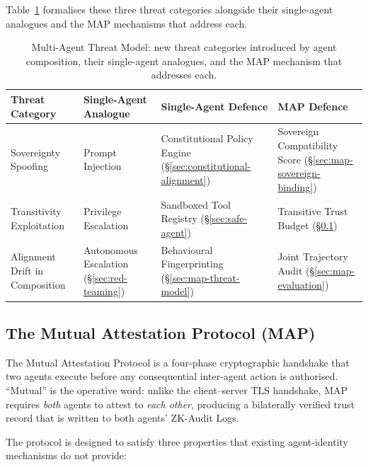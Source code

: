 Table~\ref{tab:map-threat-model} formalises these three threat categories
alongside their single-agent analogues and the MAP mechanisms that address
each.

\begin{table}[h]
\caption{Multi-Agent Threat Model: new threat categories introduced by
         agent composition, their single-agent analogues, and the MAP
         mechanism that addresses each.}
\label{tab:map-threat-model}
\begin{tabular}{p{2.8cm} p{3.2cm} p{3.0cm} p{3.2cm}}
\toprule
\textbf{Threat Category}
  & \textbf{Single-Agent Analogue}
  & \textbf{Single-Agent Defence}
  & \textbf{MAP Defence} \\
\midrule
Sovereignty Spoofing
  & Prompt Injection
  & Constitutional Policy Engine (§\ref{sec:constitutional-alignment})
  & Sovereign Compatibility Score (\S\ref{sec:map-sovereign-binding}) \\
\addlinespace
Transitivity Exploitation
  & Privilege Escalation
  & Sandboxed Tool Registry (§\ref{sec:safe-agent})
  & Transitive Trust Budget (§\ref{sec:map-protocol}) \\
\addlinespace
Alignment Drift in Composition
  & Autonomous Escalation (§\ref{sec:red-teaming})
  & Behavioural Fingerprinting (\S\ref{sec:map-threat-model})
  & Joint Trajectory Audit (§\ref{sec:map-evaluation}) \\
\bottomrule
\end{tabular}
\end{table}

\subsection{The Mutual Attestation Protocol (MAP)}
\label{sec:map-protocol}

The Mutual Attestation Protocol is a four-phase cryptographic handshake
that two agents execute before any consequential inter-agent action is
authorised.  ``Mutual'' is the operative word: unlike the client--server
TLS handshake, MAP requires \emph{both} agents to attest to \emph{each
other}, producing a bilaterally verified trust record that is written to
both agents' ZK-Audit Logs.

The protocol is designed to satisfy three properties that existing
agent-identity mechanisms do not provide:

